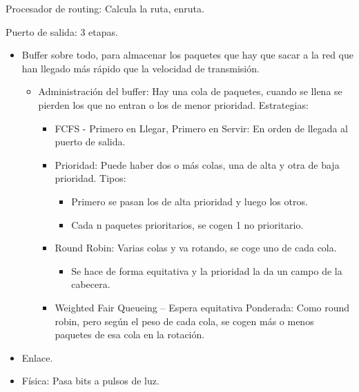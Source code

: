 \documentclass[12pt, twoside, openright]{report} %
\begin{document}
\begin{itemize}
\begin{itemize}
	      \end{itemize}
\end{itemize}

Procesador de routing: Calcula la ruta, enruta.

Puerto de salida: 3 etapas.

\begin{itemize}
	\item Buffer sobre todo, para almacenar los paquetes que hay que sacar a
	      la red que han llegado más rápido que la velocidad de transmisión.

	      \begin{itemize}
		      \item Administración del buffer: Hay una cola de paquetes, cuando se
		            llena se pierden los que no entran o los de menor prioridad.
		            Estrategias:

		            \begin{itemize}
			            \item FCFS - Primero en Llegar, Primero en Servir: En orden de
			                  llegada al puerto de salida.
			            \item Prioridad: Puede haber dos o más colas, una de alta y otra de
			                  baja prioridad. Tipos:

			                  \begin{itemize}
				                  \item Primero se pasan los de alta prioridad y luego los otros.
				                  \item Cada n paquetes prioritarios, se cogen 1 no prioritario.
			                  \end{itemize}
			            \item Round Robin: Varias colas y va rotando, se coge uno de cada
			                  cola.

			                  \begin{itemize}
				                  \item Se hace de forma equitativa y la prioridad la da un campo de
				                        la cabecera.
			                  \end{itemize}
			            \item Weighted Fair Queueing -- Espera equitativa Ponderada: Como
			                  round robin, pero según el peso de cada cola, se cogen más o
			                  menos paquetes de esa cola en la rotación.
		            \end{itemize}
	      \end{itemize}
	\item Enlace.
	\item Física: Pasa bits a pulsos de luz.
\end{itemize}
\pagebreak
\end{document}
